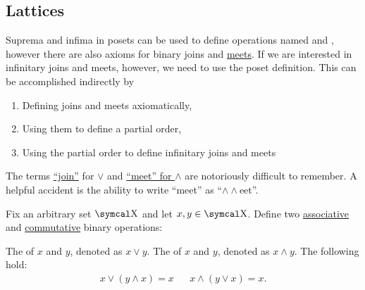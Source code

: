 \subsection{Lattices}\label{subsec:lattices}

\begin{Remark}\label{remark:infinite_lattice_operations}
  Suprema and infima in posets can be used to define operations named \hyperref[def:binary_lattice_operations/join]{} and \hyperref[def:binary_lattice_operations/meet]{}, however there are also axioms for binary joins and \hyperref[def:binary_lattice_operations]{meets}. If we are interested in infinitary joins and meets, however, we need to use the poset definition. This can be accomplished indirectly by
  \begin{enumerate}
    \item Defining joins and meets axiomatically,
    \item Using them to define a partial order,
    \item Using the partial order to define infinitary joins and meets
  \end{enumerate}
\end{Remark}

\begin{Remark}\label{remark:lattice_operation_etymology}
  The terms \hyperref[def:binary_lattice_operations/join]{\enquote{join}} for \( \vee \) and \hyperref[def:binary_lattice_operations/meet]{\enquote{meet} for \( \wedge \)} are notoriously difficult to remember. A helpful accident is the ability to write \enquote{meet} as \enquote{\( \wedge \wedge \)eet}.
\end{Remark}

\begin{Definition}\label{def:binary_lattice_operations}
  Fix an arbitrary set \( \CX \) and let \( x, y \in \CX \). Define two \hyperref[def:algebraic_theory/associativity]{associative} and \hyperref[def:algebraic_theory/commutativity]{commutative} binary operations:
  \begin{DefEnum}
     The  of \( x \) and \( y \), denoted as \( x \vee y \).
     The  of \( x \) and \( y \), denoted as \( x \wedge y \).
     The following  hold:
    \begin{align*}
      x \vee (y \wedge x) = x
      &&
      x \wedge (y \vee x) = x.
    \end{align*}
  \end{DefEnum}
\end{Definition}

